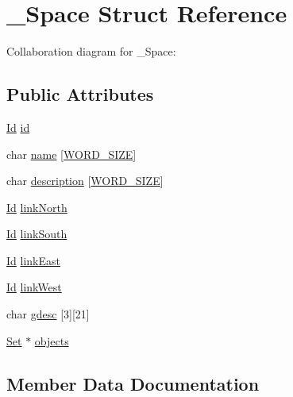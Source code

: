 \hypertarget{struct__Space}{}\section{\+\_\+\+Space Struct Reference}
\label{struct__Space}


Collaboration diagram for \+\_\+\+Space\+:
\subsection*{Public Attributes}
\begin{DoxyCompactItemize}
\item 
\hyperlink{types_8h_a845e604fb28f7e3d97549da3448149d3}{Id} \hyperlink{struct__Space_a70cb461deb9ac073e401b607339b567f}{id}
\item 
char \hyperlink{struct__Space_a4e8775f2ba9ae19392f9942dbb5f5ec0}{name} \mbox{[}\hyperlink{types_8h_a92ed8507d1cd2331ad09275c5c4c1c89}{W\+O\+R\+D\+\_\+\+S\+I\+ZE}\mbox{]}
\item 
char \hyperlink{struct__Space_a2a50aacb78d1d0f65f5b14f94ed81d80}{description} \mbox{[}\hyperlink{types_8h_a92ed8507d1cd2331ad09275c5c4c1c89}{W\+O\+R\+D\+\_\+\+S\+I\+ZE}\mbox{]}
\item 
\hyperlink{types_8h_a845e604fb28f7e3d97549da3448149d3}{Id} \hyperlink{struct__Space_a3f2998ecc940b5cdab73e38188886902}{link\+North}
\item 
\hyperlink{types_8h_a845e604fb28f7e3d97549da3448149d3}{Id} \hyperlink{struct__Space_a642c37093a6ccc0203a655c3fc0a93d3}{link\+South}
\item 
\hyperlink{types_8h_a845e604fb28f7e3d97549da3448149d3}{Id} \hyperlink{struct__Space_adbf9d4d57d188ef48d3e361fb77a92cf}{link\+East}
\item 
\hyperlink{types_8h_a845e604fb28f7e3d97549da3448149d3}{Id} \hyperlink{struct__Space_aaa6f5fa10a67afc466e3b272099dc398}{link\+West}
\item 
char \hyperlink{struct__Space_a0a71c4c0a4a1698f7d860ba5b80beb7f}{gdesc} \mbox{[}3\mbox{]}\mbox{[}21\mbox{]}
\item 
\hyperlink{set_8h_a6d3b7f7c92cbb4577ef3ef7ddbf93161}{Set} $\ast$ \hyperlink{struct__Space_a661ed8b0fc8085b6db70188aa5085625}{objects}
\end{DoxyCompactItemize}


\subsection{Member Data Documentation}
